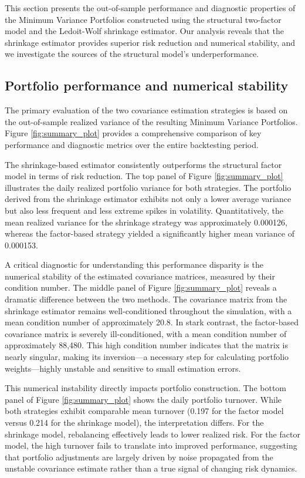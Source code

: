 \documentclass[]{article}
\begin{document}
This section presents the out-of-sample performance and diagnostic properties of the Minimum Variance Portfolios constructed using the structural two-factor model and the Ledoit-Wolf shrinkage estimator. Our analysis reveals that the shrinkage estimator provides superior risk reduction and numerical stability, and we investigate the sources of the structural model's underperformance.

\subsection{Portfolio performance and numerical stability}
The primary evaluation of the two covariance estimation strategies is based on the out-of-sample realized variance of the resulting Minimum Variance Portfolios. Figure \ref{fig:summary_plot} provides a comprehensive comparison of key performance and diagnostic metrics over the entire backtesting period.

The shrinkage-based estimator consistently outperforms the structural factor model in terms of risk reduction. The top panel of Figure \ref{fig:summary_plot} illustrates the daily realized portfolio variance for both strategies. The portfolio derived from the shrinkage estimator exhibits not only a lower average variance but also less frequent and less extreme spikes in volatility. Quantitatively, the mean realized variance for the shrinkage strategy was approximately 0.000126, whereas the factor-based strategy yielded a significantly higher mean variance of 0.000153.

A critical diagnostic for understanding this performance disparity is the numerical stability of the estimated covariance matrices, measured by their condition number. The middle panel of Figure \ref{fig:summary_plot} reveals a dramatic difference between the two methods. The covariance matrix from the shrinkage estimator remains well-conditioned throughout the simulation, with a mean condition number of approximately 20.8. In stark contrast, the factor-based covariance matrix is severely ill-conditioned, with a mean condition number of approximately 88,480. This high condition number indicates that the matrix is nearly singular, making its inversion---a necessary step for calculating portfolio weights---highly unstable and sensitive to small estimation errors.

This numerical instability directly impacts portfolio construction. The bottom panel of Figure \ref{fig:summary_plot} shows the daily portfolio turnover. While both strategies exhibit comparable mean turnover (0.197 for the factor model versus 0.214 for the shrinkage model), the interpretation differs. For the shrinkage model, rebalancing effectively leads to lower realized risk. For the factor model, the high turnover fails to translate into improved performance, suggesting that portfolio adjustments are largely driven by noise propagated from the unstable covariance estimate rather than a true signal of changing risk dynamics.
\end{document}
